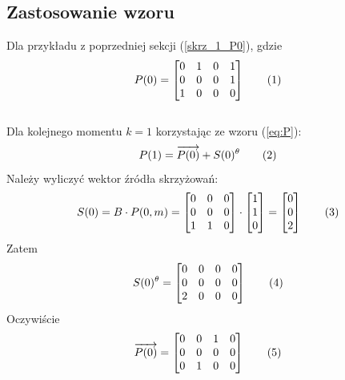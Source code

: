 \documentclass[12pt]{book}
\theoremstyle{plain}
\newcommand\addtag{\refstepcounter{equation}
\renewcommand{\labelenumii}{\theenumii}
\renewcommand{\theenumii}{\theenumi.\arabic{enumii}.}
\tag{\theequation}}
\begin{document}
\subsection{Zastosowanie wzoru}
Dla przykładu z poprzedniej sekcji (\ref{skrz_1_P0}), gdzie
\[P(0)= \begin{bmatrix} 0 & 1 & 0 & 1\\
       0 & 0 & 0 & 1 \\
       1 & 0 & 0 & 0 \end{bmatrix} \addtag \]
\\Dla kolejnego momentu $k=1$ korzystając ze wzoru (\ref{eq:P}):
\[P(1)=\overrightarrow{P(0)}+S(0)^\theta \addtag \label{eq:P_1} \]
Należy wyliczyć wektor źródła skrzyżowań:
\[S(0)=B\cdot P(0,m)=
  \begin{bmatrix}
   0 & 0 & 0\\
   0 & 0 & 0\\
   1 & 1 & 0\\
   \end{bmatrix}
   \cdot
   \begin{bmatrix}
   1\\
   1\\
   0\\
   \end{bmatrix}
   =
      \begin{bmatrix}
   0\\
   0\\
   2\\
   \end{bmatrix} \addtag
 \]
 Zatem 
 \[S(0)^\theta=\begin{bmatrix}
 0 & 0 & 0 & 0\\
 0 & 0 & 0 & 0\\
 2 & 0 & 0 & 0\\
 \end{bmatrix} \addtag\]
 Oczywiście
 \[ \overrightarrow{P(0)}=
\begin{bmatrix}
 0 & 0 & 1 & 0\\
 0 & 0 & 0 & 0\\
 0 & 1 & 0 & 0\\
 \end{bmatrix} \addtag
 \]
  
\end{document}
